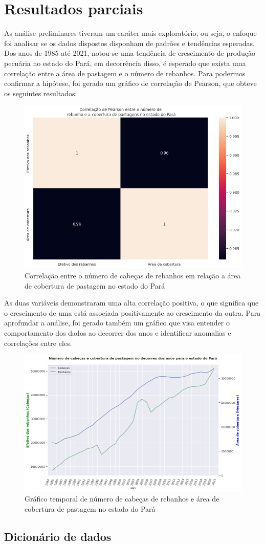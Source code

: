 
\section{Resultados parciais}

As análise preliminares tiveram um caráter mais exploratório, ou seja, o enfoque foi analisar se os dados dispostos disponham de padrões e tendências esperadas. Dos anos de 1985 até 2021, notou-se uma tendência de crescimento de produção pecuária no estado do Pará, em decorrência disso, é esperado que exista uma correlação entre a área de pastagem e o número de rebanhos. Para podermos confirmar a hipótese, foi gerado um gráfico de correlação de Pearson, que obteve os seguintes resultados: 

\begin{figure}[hbt!]
    \centering
    \includegraphics[width=0.7\columnwidth]{src/corr_rebanho_pastagem.png}
    \caption{Correlação entre o número de cabeças de rebanhos em relação a área de cobertura de pastagem no estado do Pará}
    \label{fig:corr_rebanho_pastagem}
\end{figure}

As duas variáveis demonstraram uma alta correlação positiva, o que significa que o crescimento de uma está associada positivamente ao crescimento da outra. Para aprofundar a análise, foi gerado também um gráfico que visa entender o comportamento dos dados ao decorrer dos anos e identificar anomalias e correlações entre eles.
\newpage
\begin{figure}[hbt!]
    \centering
    \includegraphics[width=0.9\columnwidth]{src/numero-cabecas-cobertura-pastagem.png}
    \caption{Gráfico temporal de número de cabeças de rebanhos e área de cobertura de pastagem no estado do Pará}
    \label{fig:numero_cabecas_cobertura_pastagem}
\end{figure}

\subsection{Dicionário de dados}